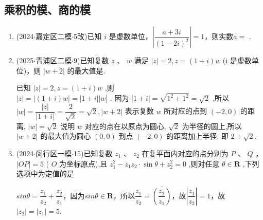 \subsection*{乘积的模、商的模}
\begin{enumerate}
    \item (2024$\cdot$嘉定区二模$\cdot$5改)已知 ${i}$ 是虚数单位，$\left| \dfrac{a + {3{i}}}{{\left( 1 - 2{i}\right) }^{2}}\right|  = 1$，则实数$a = $ .
    \item (2025$\cdot$青浦区二模$\cdot$9)已知复数 $z$ 、 $w$ 满足 $\left| z\right|  = 2,z = \left( {1 + {i}}\right) w$ (i 是虚数单位)，则 $\left| {w + 2}\right|$ 的最大值是.
    \begin{jieda}
        已知 $\left| z\right|  = 2,z = \left( {1 + {i}}\right) w$ ,则 $\left| z\right|  = \left| {\left( {1 + {i}}\right) w}\right|  =  \mid  1 +  {i}\left| \right| w\left| \text{ . 因为 }\right| 1 + {i} \mid   = \sqrt{{1}^{2} + {1}^{2}} = \sqrt{2}$ ,所以 $\left| w\right|  = \dfrac{\left| z\right| }{\left| 1 + {i}\right| } = \dfrac{2}{\sqrt{2}} =  \sqrt{2},\left| {w + 2}\right|$ 表示复数 $w$ 所对应的点到 $\left( {-2,0}\right)$ 的距离, $\left| w\right|  =  \sqrt{2}$ 说明 $w$ 对应的点在以原点为圆心, $\sqrt{2}$ 为半径的圆上,所以 $\left| {w + 2}\right|$ 的最大值为圆心 $\left( {0,0}\right)$ 到点 $\left( {-2,0}\right)$ 的距离加上半径, 即 $2 + \sqrt{2}$.
    \end{jieda}
    \item (2024$\cdot$闵行区一模$\cdot$15)已知复数 ${z}_{1}$ 、 ${z}_{2}$ 在复平面内对应的点分别为 $P$ 、 $Q$ ， $\left| {OP}\right|  = 5$ ( $O$ 为坐标原点),且 ${z}_{1}^{2} - {z}_{1}{z}_{2} \cdot  \sin \theta  + {z}_{2}^{2} = 0$ ,则对任意 $\theta  \in  \mathbf{R}$ ,下列选项中为定值的是 
    \begin{jieda}
        $sin\theta = \dfrac{z_1}{z_2} + \dfrac{z_2}{z_1}$，因为$sin\theta \in \mathbf{R}$，所以$\dfrac{z_1}{z_2} = \overline{\left(\dfrac{z_2}{z_1}\right)}$，故$\left|\dfrac{z_1}{z_2}\right| = 1$，故$|z_2| = |z_1| = 5$.
    \end{jieda}
\end{enumerate}
